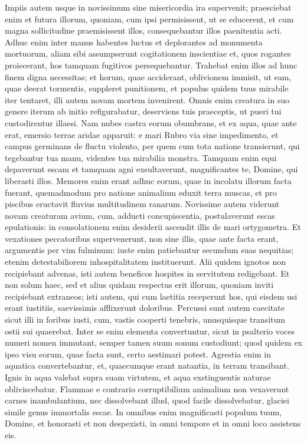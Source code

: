 \begin{biblechapter}  
\verse Impiis autem usque in novissimum sine misericordia ira supervenit; praesciebat enim et futura illorum, 
\verse quoniam, cum ipsi permisissent, ut se educerent, et cum magna sollicitudine praemisissent illos, consequebantur illos paenitentia acti. 
\verse Adhuc enim inter manus habentes luctus et deplorantes ad monumenta mortuorum, aliam sibi assumpserunt cogitationem inscientiae et, quos rogantes proiecerant, hos tamquam fugitivos persequebantur. 
\verse Trahebat enim illos ad hunc finem digna necessitas; et horum, quae acciderant, oblivionem immisit, ut eam, quae deerat tormentis, suppleret punitionem, 
\verse et populus quidem tuus mirabile iter tentaret, illi autem novam mortem invenirent. 
\verse Omnis enim creatura in suo genere iterum ab initio refigurabatur, deserviens tuis praeceptis, ut pueri tui custodirentur illaesi. 
\verse Nam nubes castra eorum obumbrans, et ex aqua, quae ante erat, emersio terrae aridae apparuit: e mari Rubro via sine impedimento, et campus germinans de fluctu violento, 
\verse per quem cum tota natione transierunt, qui tegebantur tua manu, videntes tua mirabilia monstra. 
\verse Tamquam enim equi depaverunt escam et tamquam agni exsultaverunt, magnificantes te, Domine, qui liberasti illos. 
\verse Memores enim erant adhuc eorum, quae in incolatu illorum facta fuerant, quemadmodum pro natione animalium eduxit terra muscas, et pro piscibus eructavit fluvius multitudinem ranarum. 
\verse Novissime autem viderunt novam creaturam avium, cum, adducti concupiscentia, postulaverunt escas epulationis: 
\verse in consolationem enim desiderii ascendit illis de mari ortygometra. 
\verse Et vexationes peccatoribus supervenerunt, non sine illis, quae ante facta erant, argumentis per vim fulminum: iuste enim patiebantur secundum suas nequitias; etenim detestabiliorem inhospitalitatem instituerunt. 
\verse Alii quidem ignotos non recipiebant advenas, isti autem beneficos hospites in servitutem redigebant. 
\verse Et non solum haec, sed et alius quidam respectus erit illorum, quoniam inviti recipiebant extraneos; 
\verse isti autem, qui cum laetitia receperunt hos, qui eisdem usi erant iustitiis, saevissimis afflixerunt doloribus. 
\verse Percussi sunt autem caecitate sicut illi in foribus iusti, cum, vastis cooperti tenebris, unusquisque transitum ostii sui quaerebat. 
\verse Inter se enim elementa convertuntur, sicut in psalterio voces numeri nomen immutant, semper tamen suum sonum custodiunt; quod quidem ex ipso visu eorum, quae facta sunt, certo aestimari potest. 
\verse Agrestia enim in aquatica convertebantur, et, quaecumque erant natantia, in terram transibant. 
\verse Ignis in aqua valebat supra suam virtutem, et aqua exstinguentis naturae obliviscebatur. 
\verse Flammae e contrario corruptibilium animalium non vexaverunt carnes inambulantium, nec dissolvebant illud, quod facile dissolvebatur, glaciei simile genus immortalis escae. 
\verse In omnibus enim magnificasti populum tuum, Domine, et honorasti et non despexisti, in omni tempore et in omni loco assistens eis. 
\end{biblechapter}
